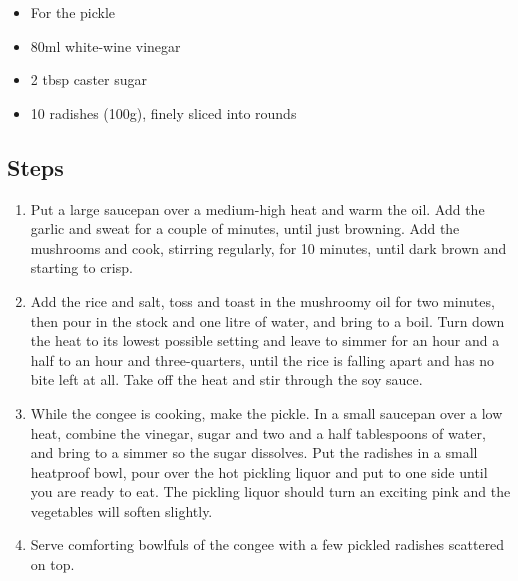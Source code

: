 \documentclass{book}
\begin{document}
\begin{itemize}
\item For the pickle
\item 80ml white-wine vinegar
\item 2 tbsp caster sugar
\item 10 radishes (100g), finely sliced into rounds
\end{itemize}

\subsection*{Steps}
\begin{enumerate}
\item Put a large saucepan over a medium-high heat and warm the oil. Add the garlic and sweat for a couple of minutes, until just browning. Add the mushrooms and cook, stirring regularly, for 10 minutes, until dark brown and starting to crisp.
\item Add the rice and salt, toss and toast in the mushroomy oil for two minutes, then pour in the stock and one litre of water, and bring to a boil. Turn down the heat to its lowest possible setting and leave to simmer for an hour and a half to an hour and three-quarters, until the rice is falling apart and has no bite left at all. Take off the heat and stir through the soy sauce.
\item While the congee is cooking, make the pickle. In a small saucepan over a low heat, combine the vinegar, sugar and two and a half tablespoons of water, and bring to a simmer so the sugar dissolves. Put the radishes in a small heatproof bowl, pour over the hot pickling liquor and put to one side until you are ready to eat. The pickling liquor should turn an exciting pink and the vegetables will soften slightly.
\item Serve comforting bowlfuls of the congee with a few pickled radishes scattered on top.
\end{enumerate}
\newpage
\end{document}

